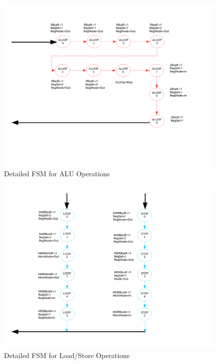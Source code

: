 \documentclass[conference]{IEEEtran}
\begin{document}
\begin{figure}[!t]
\centering
\includegraphics[width=\textwidth]{ControlFSMp2.pdf}
\caption{Detailed FSM for ALU Operations}
\label{fig_sim}
\end{figure}

\clearpage

\begin{figure}[!t]
\centering
\includegraphics[width=\textwidth]{ControlFSMp3.pdf}
\caption{Detailed FSM for Load/Store Operations}
\label{fig_sim}
\end{figure}


\clearpage
\end{document}
